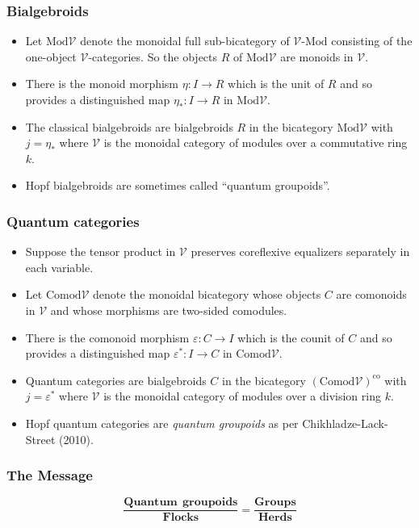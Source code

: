 \documentclass{beamer}
\newcommand{\lra}{\longrightarrow}
\def\CV{{\mathscr V}}
\begin{document}
 \begin{frame}
  \frametitle{Bialgebroids}
\begin{example} 
\begin{itemize}
\item Let $\mathrm{Mod}\CV$ denote the monoidal full sub-bicategory of $\CV\text{-}\mathrm{Mod}$ 
consisting of the one-object $\CV$-categories. So the objects $R$ of $\mathrm{Mod}\CV$ are 
monoids in $\CV$. 
\pause
\item There is the monoid morphism $\eta : I \lra R$ which is the unit of $R$
and so provides a distinguished map $\eta_* : I \lra R$ in $\mathrm{Mod}\CV$. 
\pause
\item The classical bialgebroids are bialgebroids $R$ in the bicategory $\mathrm{Mod}\CV$ with $j = \eta_*$ where $\CV$ is the monoidal category of modules over a commutative ring $k$. 
\pause
\item Hopf bialgebroids are sometimes called ``quantum groupoids''.  
\end{itemize}  
\end{example}
\end{frame}
 \begin{frame}
  \frametitle{Quantum categories}
\begin{example} 
\begin{itemize}
\item Suppose the tensor product in $\CV$ preserves coreflexive equalizers separately in each variable.
\pause
\item Let $\mathrm{Comod}\CV$ denote the monoidal bicategory whose objects $C$ are 
comonoids in $\CV$ and whose morphisms are two-sided comodules. 
\pause
\item There is the comonoid morphism $\varepsilon : C \lra I$ which is the counit of $C$
and so provides a distinguished map $\varepsilon^* : I \lra C$ in $\mathrm{Comod}\CV$. 
\pause
\item Quantum categories are bialgebroids $C$ in the bicategory $(\mathrm{Comod}\CV)^{\mathrm{co}}$ with $j = \varepsilon^*$ where $\CV$ is the monoidal category of modules over a division ring $k$.
\pause
\item Hopf quantum categories are {\em quantum groupoids} as per Chikhladze-Lack-Street (2010).
\end{itemize} 
\end{example}
\end{frame}

\begin{frame}
\frametitle{The Message}

\Large{
\[
\frac{\mathbf{Quantum \ \ groupoids}}{\mathbf{Flocks}}=\frac{\mathbf{Groups}}{\mathbf{Herds}}
\]}
\end{frame}
\end{document}
